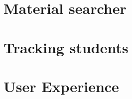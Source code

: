 \documentclass{sig-alternate-05-2015}
\begin{document}












%




\section{Material searcher}


\section{Tracking students}

\section{User Experience}
\end{document}
